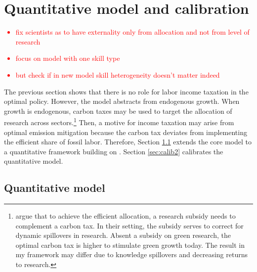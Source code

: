 \section{Quantitative model and calibration}\label{sec:model2}
\textcolor{red}{
\begin{itemize}
	\item fix scientists as to have externality only from allocation and not from level of research
	\item focus on model with one skill type
	\item but check if in new model skill heterogeneity doesn't matter indeed
\end{itemize}}

The previous section shows that there is no role for labor income taxation in the optimal policy. However, the model abstracts from endogenous growth. When growth is endogenous, carbon taxes may be used to target the allocation of research across sectors.\footnote{ \cite{Acemoglu2012TheChange} argue that to achieve the efficient allocation, a research subsidy needs to complement a carbon tax. In their setting, the subsidy serves to correct for dynamic spillovers in research. Absent a subsidy on green research, the optimal carbon tax is higher to stimulate green growth today. The result in my framework may differ due to knowledge spillovers and decreasing returns to research. } Then, a motive for income taxation may arise from optimal emission mitigation because the carbon tax deviates from implementing the efficient share of fossil labor. 
Therefore, Section \ref{sec_quantmod} extends the core model to a quantitative framework building on \cite{Fried2018ClimateAnalysis}. Section \ref{sec:calib2} calibrates the quantitative model. 

\subsection{Quantitative model}\label{sec_quantmod}


